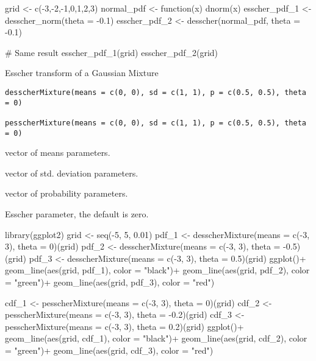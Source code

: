 \documentclass[a4paper]{book}
\begin{document}
%
\begin{Examples}
\begin{ExampleCode}
grid <- c(-3,-2,-1,0,1,2,3)
normal_pdf <- function(x) dnorm(x)
esscher_pdf_1 <- desscher_norm(theta = -0.1)
esscher_pdf_2 <- desscher(normal_pdf, theta = -0.1)

# Same result
esscher_pdf_1(grid)
esscher_pdf_2(grid)

\end{ExampleCode}
\end{Examples}
%
\begin{Description}\relax
Esscher transform of a Gaussian Mixture
\end{Description}
%
\begin{Usage}
\begin{verbatim}
desscherMixture(means = c(0, 0), sd = c(1, 1), p = c(0.5, 0.5), theta = 0)

pesscherMixture(means = c(0, 0), sd = c(1, 1), p = c(0.5, 0.5), theta = 0)
\end{verbatim}
\end{Usage}
%
\begin{Arguments}
\begin{ldescription}
\item[\code{means}] vector of means parameters.

\item[\code{sd}] vector of std. deviation parameters.

\item[\code{p}] vector of probability parameters.

\item[\code{theta}] Esscher parameter, the default is zero.
\end{ldescription}
\end{Arguments}
%
\begin{Examples}
\begin{ExampleCode}
library(ggplot2)
grid <- seq(-5, 5, 0.01)
pdf_1 <- desscherMixture(means = c(-3, 3), theta = 0)(grid)
pdf_2 <- desscherMixture(means = c(-3, 3), theta = -0.5)(grid)
pdf_3 <- desscherMixture(means = c(-3, 3), theta = 0.5)(grid)
ggplot()+
 geom_line(aes(grid, pdf_1), color = "black")+
 geom_line(aes(grid, pdf_2), color = "green")+
 geom_line(aes(grid, pdf_3), color = "red")

cdf_1 <- pesscherMixture(means = c(-3, 3), theta = 0)(grid)
cdf_2 <- pesscherMixture(means = c(-3, 3), theta = -0.2)(grid)
cdf_3 <- pesscherMixture(means = c(-3, 3), theta = 0.2)(grid)
ggplot()+
  geom_line(aes(grid, cdf_1), color = "black")+
  geom_line(aes(grid, cdf_2), color = "green")+
  geom_line(aes(grid, cdf_3), color = "red")

\end{ExampleCode}
\end{Examples}
\end{document}

